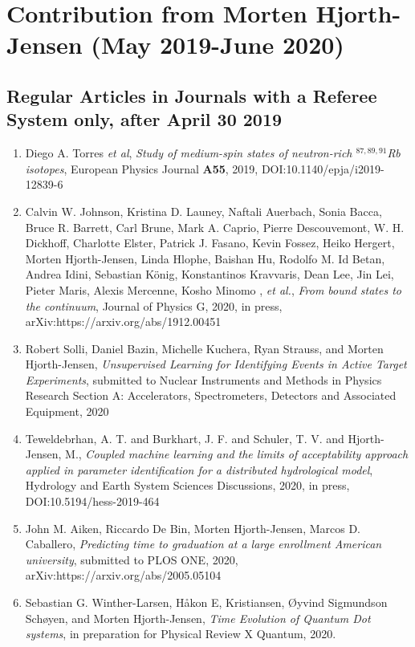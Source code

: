 \documentclass[prc,amsart,english,superscriptaddress,showpacs,floatfix]{revtex4}
\begin{document}
\section*{Contribution from Morten Hjorth-Jensen (May 2019-June 2020)}

\subsection*{Regular Articles in Journals with a Referee System only, after April 30 2019}
\begin{enumerate}
\item Diego A. Torres {\em et al}, {\em Study of medium-spin states of neutron-rich $^{87, 89,91}$Rb isotopes}, European Physics Journal {\bf A55}, 2019, DOI:10.1140/epja/i2019-12839-6
\item  Calvin W. Johnson, Kristina D. Launey, Naftali Auerbach, Sonia Bacca, Bruce R. Barrett, Carl Brune, Mark A. Caprio, Pierre Descouvemont, W. H. Dickhoff, Charlotte Elster, Patrick J. Fasano, Kevin Fossez, Heiko Hergert, Morten Hjorth-Jensen, Linda Hlophe, Baishan Hu, Rodolfo M. Id Betan, Andrea Idini, Sebastian König, Konstantinos Kravvaris, Dean Lee, Jin Lei, Pieter Maris, Alexis Mercenne, Kosho Minomo , {\em et al.}, {\em From bound states to the continuum}, Journal of Physics G, 2020, in press, arXiv:https://arxiv.org/abs/1912.00451 
\item  Robert Solli, Daniel Bazin, Michelle Kuchera, Ryan Strauss, and Morten Hjorth-Jensen, {\em Unsupervised Learning  for Identifying  Events in Active Target  Experiments}, submitted to Nuclear Instruments and Methods in Physics Research Section A: Accelerators, Spectrometers, Detectors and Associated Equipment, 2020
\item Teweldebrhan, A. T. and Burkhart, J. F. and Schuler, T. V. and Hjorth-Jensen, M., {\em Coupled machine learning and the limits of acceptability approach applied in parameter identification for a distributed hydrological model}, Hydrology and Earth System Sciences Discussions, 2020, in press, DOI:10.5194/hess-2019-464
\item  John M. Aiken, Riccardo De Bin, Morten Hjorth-Jensen, Marcos D. Caballero, {\em Predicting time to graduation at a large enrollment American university}, submitted to PLOS ONE, 2020, arXiv:https://arxiv.org/abs/2005.05104
\item Sebastian G. Winther-Larsen, H\aa kon E, Kristiansen, \O yvind Sigmundson Sch\o yen, and Morten Hjorth-Jensen, {\em Time Evolution of Quantum Dot systems}, in preparation for Physical Review X Quantum, 2020.
\end{enumerate}
\end{document}
